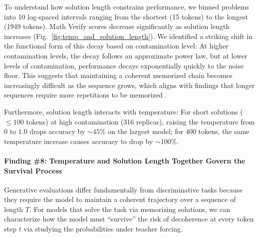 To understand how solution length constrains performance, we binned problems into 10 log-spaced intervals ranging from the shortest (15 tokens) to the longest (1949 tokens).
Math Verify scores decrease significantly as solution length increases (Fig.~\ref{fig:temp_and_solution_length}).
We identified a striking shift in the functional form of this decay based on contamination level:
At higher contamination levels, the decay follows an approximate power law, but at lower levels of contamination, performance decays exponentially quickly to the noise floor.
This suggests that maintaining a coherent memorized chain becomes increasingly difficult as the sequence grows, which aligns with findings that longer sequences require more repetitions to be memorized \citep{jiang2025a,lu2024scaling}.

Furthermore, solution length interacts with temperature:
For short solutions ($\leq 100$ tokens) at high contamination (316 replicas), raising the temperature from $0$ to $1.0$ drops accuracy by $\mathord{\sim}45\%$ on the largest model; for $400$ tokens, the same temperature increase causes accuracy to drop by $\mathord{\sim}100\%$.


\paragraph{Finding \#8: Temperature and Solution Length Together Govern the Survival Process}

Generative evaluations differ fundamentally from discriminative tasks because they require the model to maintain a coherent trajectory over a sequence of length $T$.
For models that solve the task via memorizing solutions, we can characterize how the model must ``survive'' the risk of decoherence at every token step $t$ via studying the probabilities under teacher forcing.

